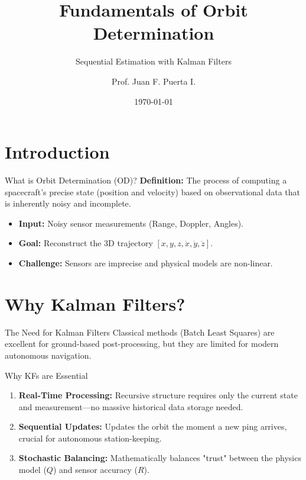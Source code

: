 \documentclass{beamer}
\title[Orbit Determination]{Fundamentals of Orbit Determination}
\subtitle{Sequential Estimation with Kalman Filters}
\author[Prof. Juan]{Prof. Juan F. Puerta I.}
\institute[UdeA]{Universidad de Antioquia}
\date{\today}
\begin{document}
\begin{frame}
    \titlepage
\end{frame}

\section{Introduction}

\begin{frame}{What is Orbit Determination (OD)?}
    \textbf{Definition:} The process of computing a spacecraft's precise state (position and velocity) based on observational data that is inherently noisy and incomplete.
    
    \vspace{0.5cm}
    \begin{itemize}
        \item \textbf{Input:} Noisy sensor measurements (Range, Doppler, Angles).
        \item \textbf{Goal:} Reconstruct the 3D trajectory $[x, y, z, \dot{x}, \dot{y}, \dot{z}]$.
        \item \textbf{Challenge:} Sensors are imprecise and physical models are non-linear.
    \end{itemize}
\end{frame}

\section{Why Kalman Filters?}

\begin{frame}{The Need for Kalman Filters}
    Classical methods (Batch Least Squares) are excellent for ground-based post-processing, but they are limited for modern autonomous navigation.
    
    \begin{block}{Why KFs are Essential}
        \begin{enumerate}
            \item \textbf{Real-Time Processing:} Recursive structure requires only the current state and measurement—no massive historical data storage needed.
            \item \textbf{Sequential Updates:} Updates the orbit the moment a new ping arrives, crucial for autonomous station-keeping.
            \item \textbf{Stochastic Balancing:} Mathematically balances "trust" between the physics model ($Q$) and sensor accuracy ($R$).
        \end{enumerate}
    \end{block}
\end{frame}
\end{document}
